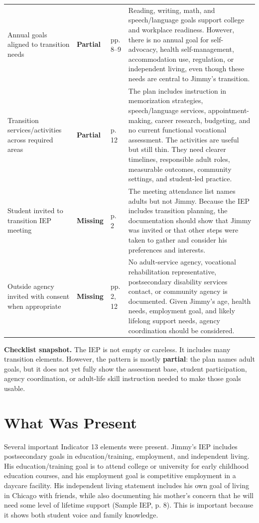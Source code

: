 \documentclass[11pt]{article}
\newcommand{\Partial}{\textbf{\textcolor{PartialOrange}{Partial}}}
\newcommand{\Missing}{\textbf{\textcolor{MissingRed}{Missing}}}
\begin{document}
\begin{longtable}{L{0.19\textwidth} L{0.11\textwidth} L{0.11\textwidth} L{0.50\textwidth}}
Annual goals aligned to transition needs & \Partial & pp. 8--9 & Reading, writing, math, and speech/language goals support college and workplace readiness. However, there is no annual goal for self-advocacy, health self-management, accommodation use, regulation, or independent living, even though these needs are central to Jimmy's transition. \\
Transition services/activities across required areas & \Partial & p. 12 & The plan includes instruction in memorization strategies, speech/language services, appointment-making, career research, budgeting, and no current functional vocational assessment. The activities are useful but still thin. They need clearer timelines, responsible adult roles, measurable outcomes, community settings, and student-led practice. \\
Student invited to transition IEP meeting & \Missing & p. 2 & The meeting attendance list names adults but not Jimmy. Because the IEP includes transition planning, the documentation should show that Jimmy was invited or that other steps were taken to gather and consider his preferences and interests. \\
Outside agency invited with consent when appropriate & \Missing & pp. 2, 12 & No adult-service agency, vocational rehabilitation representative, postsecondary disability services contact, or community agency is documented. Given Jimmy's age, health needs, employment goal, and likely lifelong support needs, agency coordination should be considered. \\
\bottomrule
\end{longtable}
\normalsize

\begin{TakeawayBox}
\textbf{Checklist snapshot.} The IEP is not empty or careless. It includes many transition elements. However, the pattern is mostly \textbf{partial}: the plan names adult goals, but it does not yet fully show the assessment base, student participation, agency coordination, or adult-life skill instruction needed to make those goals usable.
\end{TakeawayBox}

\section{What Was Present}

Several important Indicator 13 elements were present. Jimmy's IEP includes postsecondary goals in education/training, employment, and independent living. His education/training goal is to attend college or university for early childhood education courses, and his employment goal is competitive employment in a daycare facility. His independent living statement includes his own goal of living in Chicago with friends, while also documenting his mother's concern that he will need some level of lifetime support (Sample IEP, p. 8). This is important because it shows both student voice and family knowledge.
\end{document}
